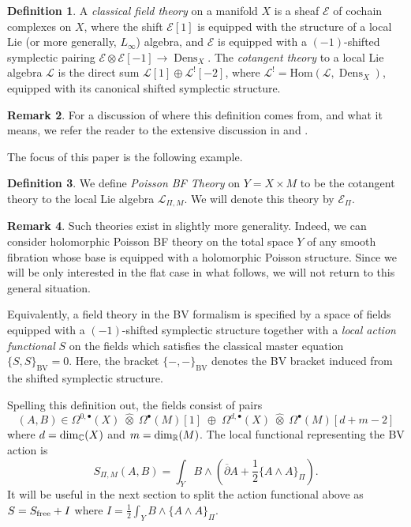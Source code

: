 \documentclass[11pt, oneside, reqno]{amsart}
\theoremstyle{definition} \newtheorem{definition}{Definition}[section]
\theoremstyle{definition}
\theoremstyle{remark}
\theoremstyle{definition} \newtheorem{remark}[definition]{Remark}
\theoremstyle{definition} \newtheorem{remarks}[definition]{Remarks}
\theoremstyle{definition} \newtheorem{question}[definition]{Question}
\theoremstyle{definition} \newtheorem*{note}{Note}
\theoremstyle{definition} \newtheorem{example}[definition]{Example}
\theoremstyle{definition} \newtheorem{examples}[definition]{Examples}
\def\bu{\bullet}
\def\Hat{\widehat}
\newcommand{\dd}{\partial}
\newcommand{\mr}[1]{\mathrm{#1}}
\newcommand{\mc}[1]{\mathcal{#1}}
\newcommand{\ol}[1]{\overline{#1}}
\DeclareMathOperator{\dens}{Dens}
\begin{document}
\begin{definition}
A \emph{classical field theory} on a manifold $X$ is a sheaf $\mc E$ of cochain complexes on $X$, where the shift $\mc E[1]$ is equipped with the structure of a local Lie (or more generally, $L_\infty$) algebra, and $\mc E$ is equipped with a $(-1)$-shifted symplectic pairing $\mc E \otimes \mc E[-1] \to \dens_X$.  The \emph{cotangent theory} to a local Lie algebra $\mc L$ is the direct sum $\mc L[1] \oplus \mc L^![-2]$, where $\mc L^! = \mr{Hom}(\mc L, \dens_X)$, equipped with its canonical shifted symplectic structure.
\end{definition}

\begin{remark}
For a discussion of where this definition comes from, and what it means, we refer the reader to the extensive discussion in \cite{CostelloBook, Book2} and \cite[Section 1.1]{ESW}.
\end{remark}

The focus of this paper is the following example.
\begin{definition}
We define \emph{Poisson BF Theory} on $Y = X \times M$ to be the cotangent theory to the local Lie algebra $\mc L_{\Pi, M}$.  
We will denote this theory by $\mc E_{\Pi}$.
\end{definition}

\begin{remark}
Such theories exist in slightly more generality.
Indeed, we can consider holomorphic Poisson BF theory on the total space $Y$ of any smooth fibration whose base is equipped with a holomorphic Poisson structure. 
Since we will be only interested in the flat case in what follows, we will not return to this general situation. 
\end{remark}

Equivalently, a field theory in the BV formalism is specified by a space of fields equipped with a $(-1)$-shifted symplectic structure together with a {\em local action functional} $S$ on the fields which satisfies the classical master equation $\{S,S\}_{\mr{BV}} = 0$.
Here, the bracket $\{-,-\}_{\mr{BV}}$ denotes the BV bracket induced from the shifted symplectic structure.

Spelling this definition out, the fields consist of pairs 
\[
(A, B) \in \Omega^{0,\bullet}(X) \; \Hat{\otimes}\; \Omega^\bu(M) [1] \; \oplus \; \Omega^{d,\bullet}(X) \; \Hat{\otimes} \;\Omega^\bu(M) [d+m-2] 
\] 
where $d = \dim_{\mathbb C}(X)$ and $m = \dim_{\mathbb R}(M)$. 
The local functional representing the BV action is
\begin{equation}\label{eqn:action2}
S_{\Pi,M}(A,B) = \int_{Y} B \wedge \left( \ol \dd A + \frac 12 \{A \wedge A\}_\Pi\right).
\end{equation}
It will be useful in the next section to split the action functional above as $S = S_{\rm free} + I$ where $I = \frac 12 \int_Y  B \wedge \{A \wedge A\}_\Pi$. 
\end{document}
